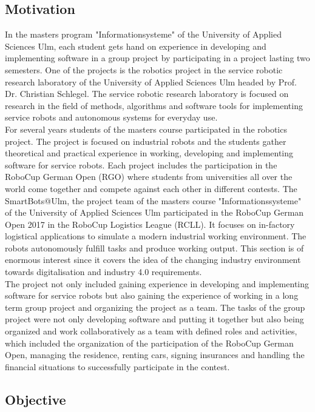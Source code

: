 \subsection{Motivation}

In the masters program "Informationsysteme" of the University of Applied Sciences Ulm, each student gets hand on experience in developing and implementing software in a group project by participating in a project lasting two semesters. One of the projects is the robotics project in the service robotic research laboratory of the University of Applied Sciences Ulm headed by Prof. Dr. Christian Schlegel. The service robotic research laboratory is focused on research in the field of methods, algorithms and software tools for implementing service robots and autonomous systems for everyday use. \\
For several years students of the masters course participated in the robotics project. The project is focused on industrial robots and the students gather theoretical and practical experience in working, developing and implementing software for service robots. Each project includes the participation in the RoboCup German Open (RGO) where students from universities all over the world come together and compete against each other in different contests. The SmartBots@Ulm, the project team of the masters course "Informationssysteme" of the University of Applied Sciences Ulm participated in the RoboCup German Open 2017 in the RoboCup Logistics League (RCLL). It focuses on in-factory logistical applications to simulate a modern industrial working environment. The robots autonomously fulfill tasks and produce working output. This section is of enormous interest since it covers the idea of the changing industry environment towards digitalisation and industry 4.0 requirements. \\
The project not only included gaining experience in developing and implementing software for service robots but also gaining the experience of working in a long term group project and organizing the project as a team. The tasks of the group project were not only developing software and putting it together but also being organized and work collaboratively as a team with defined roles and activities, which included the organization of the participation of the RoboCup German Open, managing the residence, renting cars, signing insurances and handling the financial situations to successfully participate in the contest. 

\subsection{Objective}

